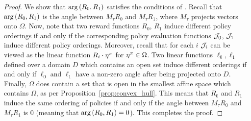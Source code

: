 \begin{proof}
We show that $\mathrm{arg}\left({R_0}, {R_1}\right)$ satisfies the conditions of \citep[Theorem 2.6]{skalse2023misspecification}. Recall that $\mathrm{arg}\left({R_0}, {R_1}\right)$ is the angle between $M_\tau R_0$ and $M_\tau R_1$, where $M_\tau$ projects vectors onto $\Omega$.
Now, note that two reward functions $R_0$, $R_1$ induce different policy orderings if and only if the corresponding policy evaluation functions $\mathcal{J}_0$, $\mathcal{J}_1$ induce different policy orderings. Moreover, recall that for each $i$ $\mathcal{J}_i$ can be viewed as the linear function $R_i \cdot \mathbf{\eta^{\pi}}$ for $\mathbf{\eta^{\pi}} \in \Omega$. Two linear functions $\ell_0, \ell_1$ defined over a domain $D$ which contains an open set induce different orderings if and only if $\ell_0$ and $\ell_1$ have a non-zero angle after being projected onto $D$. Finally, $\Omega$ does contain a set that is open in the smallest affine space which contains $\Omega$, as per Proposition~\ref{prop:convex_hull}. This means that $R_0$ and $R_1$ induce the same ordering of policies if and only if the angle between $M_\tau R_0$ and $M_\tau R_1$ is 0 (meaning that $\mathrm{arg}\left({R_0}, {R_1}\right) = 0$). This completes the proof.
\end{proof}

